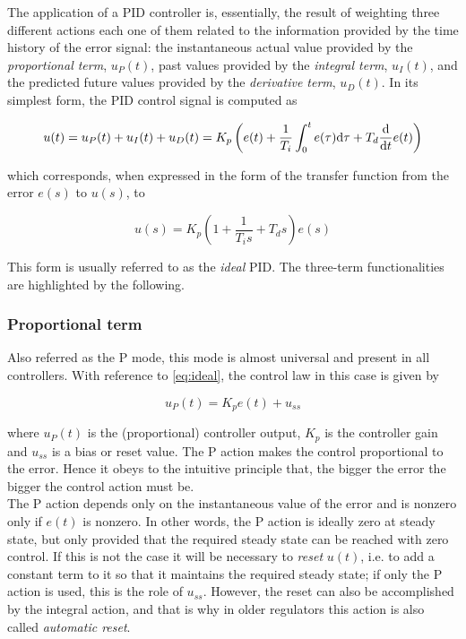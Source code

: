 The application of a PID controller is, essentially, the result of weighting three different actions each one of them related to the information provided by the time history of the error signal: the instantaneous actual value provided by the  \emph{proportional term}, $u_P(t)$, past values provided by the \emph{integral term}, $u_I(t)$, and the predicted future values provided by the \emph{derivative term}, $u_D(t)$.  In its simplest form, the PID control signal is computed as

\begin{equation}
u(t)=u_P(t)+u_I(t)+u_D(t)= K_p \left ( e(t)+\frac{1}{T_i}\int_0^t e(\tau)\mathrm{d} \tau+T_d\frac{\mathrm{d}}{\mathrm{d} t}e(t) \right )
\end{equation}

\noindent which corresponds, when expressed in the form of the transfer function from the error $e(s)$ to $u(s)$, to

\begin{equation}
u(s)=K_p \left ( 1+\frac{1}{T_is}+{T_ds} \right )  e(s)
\label{Ch2eq:PID_ideal}
\end{equation}

This form is usually referred to as the \emph{ideal} PID. The three-term functionalities are highlighted by the following.

\subsubsection*{Proportional term}

Also referred as the P mode, this mode is almost universal and present in all controllers. With reference to \eqref{eq:ideal}, the control law in this case is given by

\[u_P (t) = K_pe(t) + u_{ss}\]

\noindent where $u_P(t)$ is the (proportional) controller output, $K_p$ is the controller gain and $u_{ss}$ is a bias or reset value. The P action makes the control proportional to the error. Hence it obeys to the intuitive principle that, the bigger the error the bigger the control action must be.\\

The P action depends only on the instantaneous value of the error and is nonzero only if $e(t)$ is nonzero. In other words, the P action is ideally zero at steady state, but only provided that the required steady state can be reached with zero control. If this is not the case it will be necessary to \emph{reset} $u(t)$, i.e. to add a constant term to it so that it maintains the required steady state; if only the P action is used, this is the role of $u_{ss}$. However, the reset can also be accomplished by the integral action, and that is why  in older regulators this action is also called \emph{automatic reset}. 


